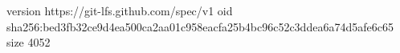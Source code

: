 version https://git-lfs.github.com/spec/v1
oid sha256:bed3fb32ce9d4ea500ca2aa01c958eacfa25b4bc96c52c3ddea6a74d5afe6c65
size 4052
